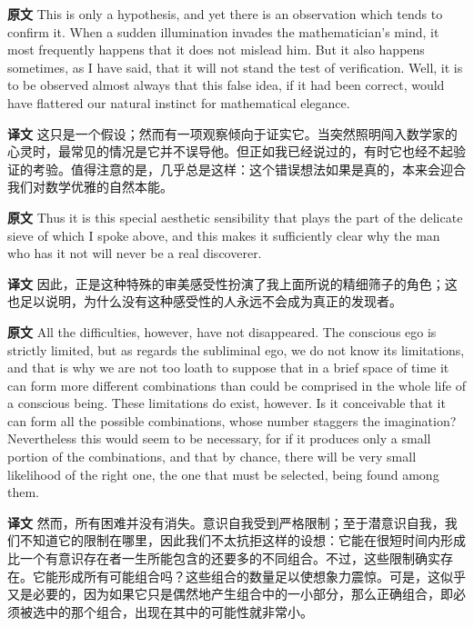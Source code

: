 \documentclass[UTF8]{ctexart}
\newenvironment{english}{\par\small\noindent\textbf{原文}\quad\ignorespaces}{\par}
\newenvironment{zhtranslation}{\par\noindent\textbf{译文}\quad\ignorespaces}{\par\vspace{0.35em}}
\begin{document}
\begin{english}
This is only a hypothesis, and yet there is an observation which tends to confirm it. When a sudden illumination invades the mathematician's mind, it most frequently happens that it does not mislead him. But it also happens sometimes, as I have said, that it will not stand the test of verification. Well, it is to be observed almost always that this false idea, if it had been correct, would have flattered our natural instinct for mathematical elegance.
\end{english}
\begin{zhtranslation}
这只是一个假设；然而有一项观察倾向于证实它。当突然照明闯入数学家的心灵时，最常见的情况是它并不误导他。但正如我已经说过的，有时它也经不起验证的考验。值得注意的是，几乎总是这样：这个错误想法如果是真的，本来会迎合我们对数学优雅的自然本能。\end{zhtranslation}

\begin{english}
Thus it is this special aesthetic sensibility that plays the part of the delicate sieve of which I spoke above, and this makes it sufficiently clear why the man who has it not will never be a real discoverer.
\end{english}
\begin{zhtranslation}
因此，正是这种特殊的审美感受性扮演了我上面所说的精细筛子的角色；这也足以说明，为什么没有这种感受性的人永远不会成为真正的发现者。\end{zhtranslation}

\begin{english}
All the difficulties, however, have not disappeared. The conscious ego is strictly limited, but as regards the subliminal ego, we do not know its limitations, and that is why we are not too loath to suppose that in a brief space of time it can form more different combinations than could be comprised in the whole life of a conscious being. These limitations do exist, however. Is it conceivable that it can form all the possible combinations, whose number staggers the imagination? Nevertheless this would seem to be necessary, for if it produces only a small portion of the combinations, and that by chance, there will be very small likelihood of the right one, the one that must be selected, being found among them.
\end{english}
\begin{zhtranslation}
然而，所有困难并没有消失。意识自我受到严格限制；至于潜意识自我，我们不知道它的限制在哪里，因此我们不太抗拒这样的设想：它能在很短时间内形成比一个有意识存在者一生所能包含的还要多的不同组合。不过，这些限制确实存在。它能形成所有可能组合吗？这些组合的数量足以使想象力震惊。可是，这似乎又是必要的，因为如果它只是偶然地产生组合中的一小部分，那么正确组合，即必须被选中的那个组合，出现在其中的可能性就非常小。\end{zhtranslation}
\end{document}
